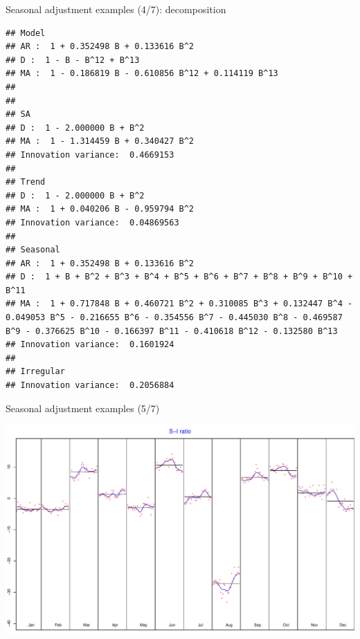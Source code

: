 \documentclass[10pt,xcolor=table,color={dvipsnames,usenames},ignorenonframetext,usepdftitle=false,french]{beamer}
\newenvironment{Shaded}{\begin{snugshade}}{\end{snugshade}}
\newcommand{\KeywordTok}[1]{\textcolor[rgb]{0.13,0.29,0.53}{\textbf{#1}}}
\newcommand{\NormalTok}[1]{#1}
\newcommand{\OperatorTok}[1]{\textcolor[rgb]{0.81,0.36,0.00}{\textbf{#1}}}
\begin{document}
\begin{frame}[fragile]{Seasonal adjustment examples (4/7):
decomposition}
\protect\hypertarget{seasonal-adjustment-examples-47-decomposition}{}

\footnotesize

\begin{Shaded}
\end{Shaded}

\begin{verbatim}
## Model
## AR :  1 + 0.352498 B + 0.133616 B^2 
## D :  1 - B - B^12 + B^13 
## MA :  1 - 0.186819 B - 0.610856 B^12 + 0.114119 B^13 
## 
## 
## SA
## D :  1 - 2.000000 B + B^2 
## MA :  1 - 1.314459 B + 0.340427 B^2 
## Innovation variance:  0.4669153 
## 
## Trend
## D :  1 - 2.000000 B + B^2 
## MA :  1 + 0.040206 B - 0.959794 B^2 
## Innovation variance:  0.04869563 
## 
## Seasonal
## AR :  1 + 0.352498 B + 0.133616 B^2 
## D :  1 + B + B^2 + B^3 + B^4 + B^5 + B^6 + B^7 + B^8 + B^9 + B^10 + B^11 
## MA :  1 + 0.717848 B + 0.460721 B^2 + 0.310085 B^3 + 0.132447 B^4 - 0.049053 B^5 - 0.216655 B^6 - 0.354556 B^7 - 0.445030 B^8 - 0.469587 B^9 - 0.376625 B^10 - 0.166397 B^11 - 0.410618 B^12 - 0.132580 B^13 
## Innovation variance:  0.1601924 
## 
## Irregular
## Innovation variance:  0.2056884
\end{verbatim}

\end{frame}

\begin{frame}[fragile]{Seasonal adjustment examples (5/7)}
\protect\hypertarget{seasonal-adjustment-examples-57}{}

\begin{Shaded}
\end{Shaded}

\includegraphics{img/markdown-unnamed-chunk-9-1.pdf}

\end{frame}
\end{document}
